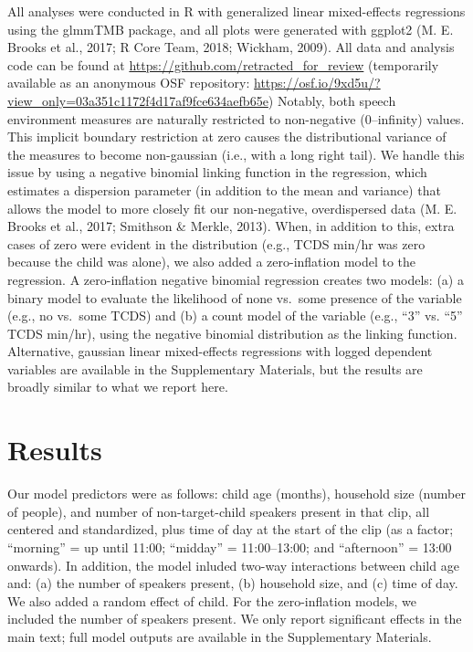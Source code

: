 \documentclass[floatsintext,man]{apa6}
\theoremstyle{definition}
\theoremstyle{definition}
\theoremstyle{definition}
\theoremstyle{remark}
\begin{document}
All analyses were conducted in R with generalized linear mixed-effects
regressions using the glmmTMB package, and all plots were generated with
ggplot2 (M. E. Brooks et al., 2017; R Core Team, 2018; Wickham, 2009).
All data and analysis code can be found at
\url{https://github.com/retracted_for_review} (temporarily available as
an anonymous OSF repository:
\url{https://osf.io/9xd5u/?view_only=03a351c1172f4d17af9fce634aefb65e})
Notably, both speech environment measures are naturally restricted to
non-negative (0--infinity) values. This implicit boundary restriction at
zero causes the distributional variance of the measures to become
non-gaussian (i.e., with a long right tail). We handle this issue by
using a negative binomial linking function in the regression, which
estimates a dispersion parameter (in addition to the mean and variance)
that allows the model to more closely fit our non-negative,
overdispersed data (M. E. Brooks et al., 2017; Smithson \& Merkle,
2013). When, in addition to this, extra cases of zero were evident in
the distribution (e.g., TCDS min/hr was zero because the child was
alone), we also added a zero-inflation model to the regression. A
zero-inflation negative binomial regression creates two models: (a) a
binary model to evaluate the likelihood of none vs.~some presence of the
variable (e.g., no vs.~some TCDS) and (b) a count model of the variable
(e.g., \enquote{3} vs. \enquote{5} TCDS min/hr), using the negative
binomial distribution as the linking function. Alternative, gaussian
linear mixed-effects regressions with logged dependent variables are
available in the Supplementary Materials, but the results are broadly
similar to what we report here.

\section{Results}\label{results}

Our model predictors were as follows: child age (months), household size
(number of people), and number of non-target-child speakers present in
that clip, all centered and standardized, plus time of day at the start
of the clip (as a factor; \enquote{morning} = up until 11:00;
\enquote{midday} = 11:00--13:00; and \enquote{afternoon} = 13:00
onwards). In addition, the model inluded two-way interactions between
child age and: (a) the number of speakers present, (b) household size,
and (c) time of day. We also added a random effect of child. For the
zero-inflation models, we included the number of speakers present. We
only report significant effects in the main text; full model outputs are
available in the Supplementary Materials.
\end{document}

